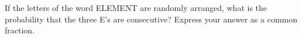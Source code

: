 If the letters of the word ELEMENT are randomly arranged, what is the probability that the three E's are consecutive? Express your answer as a common fraction.
